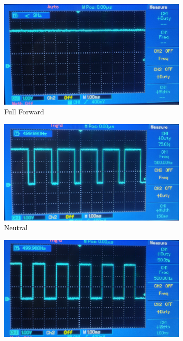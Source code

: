 \begin{figure}
	\begin{center}
		\begin{subfigure}{0.47\linewidth}
			\includegraphics[width = \linewidth]{figures/PWMfoward.jpg}
			\caption{Full Forward}
			\label{fig:4:OscTest:forward}	
		\end{subfigure}
		\begin{subfigure}{0.47\linewidth}
			\includegraphics[width = \linewidth]{figures/PWMneutral.jpg}
			\caption{Neutral}
			\label{fig:4:OscTest:neutral}	
		\end{subfigure}
		\begin{subfigure}{0.47\linewidth}
			\includegraphics[width = \linewidth]{figures/PWMreverse.jpg}

\end{subfigure}
\end{center}
\end{figure}
